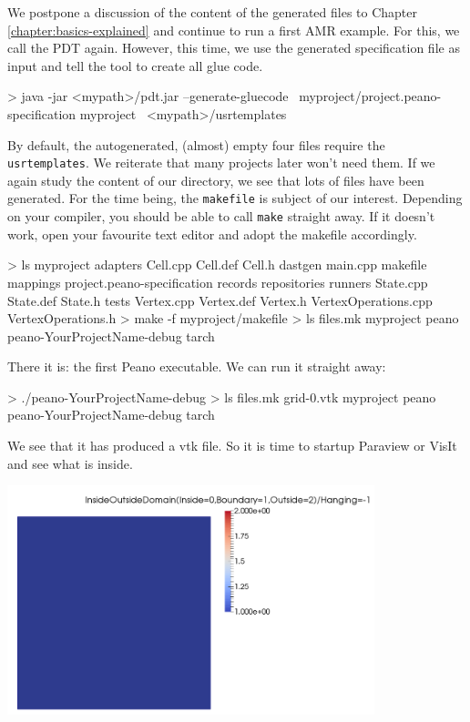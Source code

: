 We postpone a discussion of the content of the generated files to Chapter
\ref{chapter:basics-explained} and continue to run a first AMR example.
For this, we call the PDT again.
However, this time, we use the generated specification file as input and tell
the tool to create all glue code.


\begin{code}
> java -jar <mypath>/pdt.jar --generate-gluecode \
  myproject/project.peano-specification myproject \
  <mypath>/usrtemplates
\end{code}

\noindent
By default, the autogenerated, (almost) empty four files require the
\texttt{usrtemplates}.
We reiterate that many projects later won't need them.
If we again study the content of our directory, we see that lots of files have
been generated.
For the time being, the \texttt{makefile} is subject of our interest.
Depending on your compiler, you should be able to call \texttt{make} straight
away. 
If it doesn't work, open your favourite text editor and adopt the makefile
accordingly.
\begin{code}
> ls myproject
  adapters   Cell.cpp              Cell.def      
  Cell.h     dastgen               main.cpp     
  makefile   mappings              project.peano-specification  
  records    repositories          runners 
  State.cpp  State.def             State.h
  tests      Vertex.cpp            Vertex.def    
  Vertex.h   VertexOperations.cpp  VertexOperations.h
> make -f myproject/makefile
> ls
  files.mk  myproject  peano  peano-YourProjectName-debug  tarch
\end{code}


\noindent
There it is: the first Peano executable. We can run it straight away:
\begin{code}
> ./peano-YourProjectName-debug
> ls
  files.mk                     grid-0.vtk  myproject  peano  
  peano-YourProjectName-debug  tarch
\end{code}

\noindent
We see that it has produced a vtk file. So it is time to startup Paraview or
VisIt and see what is inside.

\begin{center}
  \includegraphics[width=0.8\textwidth]{2_quickstart/screenshot00.png}
\end{center}

